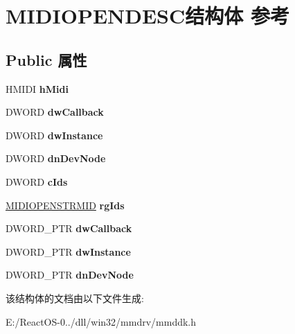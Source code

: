 \hypertarget{struct_m_i_d_i_o_p_e_n_d_e_s_c}{}\section{M\+I\+D\+I\+O\+P\+E\+N\+D\+E\+S\+C结构体 参考}
\label{struct_m_i_d_i_o_p_e_n_d_e_s_c}
\subsection*{Public 属性}
\begin{DoxyCompactItemize}
\item 
\mbox{\label{struct_m_i_d_i_o_p_e_n_d_e_s_c_a0d1d8f7efd2fdf6245af00ac688fa2e1}} 
H\+M\+I\+DI {\bfseries h\+Midi}
\item 
\mbox{\label{struct_m_i_d_i_o_p_e_n_d_e_s_c_a7829f50a33b4792af1eda4fd57d3c418}} 
D\+W\+O\+RD {\bfseries dw\+Callback}
\item 
\mbox{\label{struct_m_i_d_i_o_p_e_n_d_e_s_c_a3685c16641ca26a6f820b346d2a44834}} 
D\+W\+O\+RD {\bfseries dw\+Instance}
\item 
\mbox{\label{struct_m_i_d_i_o_p_e_n_d_e_s_c_a799277f66ba7db9f68748b719bcdc50d}} 
D\+W\+O\+RD {\bfseries dn\+Dev\+Node}
\item 
\mbox{\label{struct_m_i_d_i_o_p_e_n_d_e_s_c_a367f23cfa1caf12b62d680605c4e9282}} 
D\+W\+O\+RD {\bfseries c\+Ids}
\item 
\mbox{\label{struct_m_i_d_i_o_p_e_n_d_e_s_c_a892dbe42a6aa611cfe7e1b7ba888b4bd}} 
\hyperlink{struct_m_i_d_i_o_p_e_n_s_t_r_m_i_d}{M\+I\+D\+I\+O\+P\+E\+N\+S\+T\+R\+M\+ID} {\bfseries rg\+Ids}
\item 
\mbox{\label{struct_m_i_d_i_o_p_e_n_d_e_s_c_a328fc7bf26b72a12dd6572fb6f2d870c}} 
D\+W\+O\+R\+D\+\_\+\+P\+TR {\bfseries dw\+Callback}
\item 
\mbox{\label{struct_m_i_d_i_o_p_e_n_d_e_s_c_ae8685582a7799229ce0a4d7f316ee9f9}} 
D\+W\+O\+R\+D\+\_\+\+P\+TR {\bfseries dw\+Instance}
\item 
\mbox{\label{struct_m_i_d_i_o_p_e_n_d_e_s_c_a246a1debee49931860e34934d3d15d4d}} 
D\+W\+O\+R\+D\+\_\+\+P\+TR {\bfseries dn\+Dev\+Node}
\end{DoxyCompactItemize}


该结构体的文档由以下文件生成\+:\begin{DoxyCompactItemize}
\item 
E\+:/\+React\+O\+S-\/0../dll/win32/mmdrv/mmddk.\+h\end{DoxyCompactItemize}
